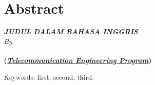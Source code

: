 \clearpage
\chapter*{Abstract}

\begin{center}
	\linespread{1}
	\large{\bfseries{
			\MakeUppercase{\textit{Judul dalam Bahasa Inggris}}
		}
	}\\[1\baselineskip]
	
	\normalsize{\textit{By}\\}
	\large{ 
		\bfseries \theauthor\\
		(\textit{\underline{Telecommunication Engineering Program}})
	}\\[2\baselineskip]
\end{center}

\medskip

\begin{spacing}{1.0}
	
	\itshape{
		\blindtext
		
		\blindtext
		
		Keywords: first, second, third.
	}
\end{spacing}

\clearpage

